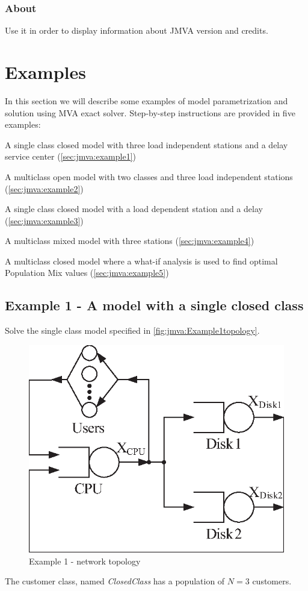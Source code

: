 \subsubsection{About}
Use it in order to display information about JMVA version and
credits.

\section{Examples}
In this section we will describe some examples of model
parametrization and solution using MVA exact solver. Step-by-step
instructions are provided in five examples:
\begin{enumerate*}
\item A single class closed model with three load independent stations and a delay service
center (\autoref{sec:jmva:example1})
\item A multiclass open model with two classes and three load independent
stations (\autoref{sec:jmva:example2})
\item A single class closed model with a load dependent station and
a delay (\autoref{sec:jmva:example3})
\item A multiclass mixed model with three stations (\autoref{sec:jmva:example4})
\item A multiclass closed model where a what-if analysis is used to find optimal
Population Mix values (\autoref{sec:jmva:example5})
\end{enumerate*}


\subsection{Example 1 - A model with a single closed class}
\label{sec:jmva:example1} Solve the single class model specified in
\autoref{fig:jmva:Example1topology}.
\begin{figure}[htbp]
    \begin{center}
        \includegraphics[scale=.65]{img/jmva/example1}
    \end{center}
    \caption{Example 1 - network topology}
    \label{fig:jmva:Example1topology}
\end{figure}
The customer class, named \emph{ClosedClass} has a population of $N
= 3$ customers.

